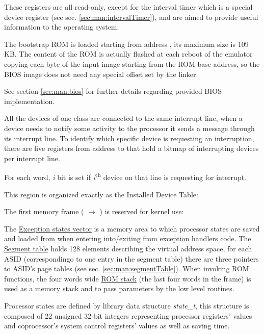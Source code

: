 
These registers are all read-only, except for the interval timer which is a special device register (see sec. \ref{sec:man:intervalTimer}), and are aimed to provide useful information to the operating system.

The bootstrap ROM is loaded starting from address , its maximum size is 109 KB.
The content of the ROM is actually flashed at each reboot of the emulator copying each byte of the input image starting from the ROM base address, so the BIOS image does not need any special offset set by the linker.

See section \ref{sec:man:bios} for further details regarding provided BIOS implementation.

All the devices of one class are connected to the same interrupt line, when a device needs to notify some activity to the processor it sends a message through its interrupt line.
To identify which specific device is requesting an interruption, there are five registers from address  to  that hold a bitmap of interrupting devices per interrupt line.

For each word, \emph{i} bit is set if \emph{i}\textsuperscript{th} device on that line is requesting for interrupt.

This region is organized exactly as the Installed Device Table:


\label{sec:man:kernelReservedFrame}
The first memory frame ( $\rightarrow$ ) is reserved for kernel use:


The \uline{Exception states vector} is a memory area to which processor states are saved and loaded from when entering into/exiting from exception handlers code.
The \uline{Segment table} holds 128 elements describing the virtual address space, for each ASID (correspondingo to one entry in the segment table) there are three pointers to ASID's page tables (see sec. \ref{sec:man:segmentTable}).
When invoking ROM functions, the four words wide \uline{ROM stack} (the last four words in the frame) is used as a memory stack and to pass parameters by the low level routines.

Processor states are defined by library data structure \emph{state\_t}, this structure is composed of 22 unsigned 32-bit integers representing processor registers' values and coprocessor's system control registers' values as well as saving time. 

